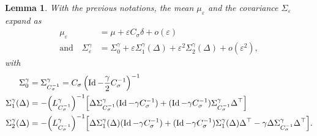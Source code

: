 \documentclass[10pt,a4paper]{amsart}
\newtheorem{lem}{Lemma}
\newcommand{\id}{\operatorname{Id}}
\begin{document}
\begin{lem} \label{lem:Langevin_1}
With the previous notations, the mean $\mu_\varepsilon$ and the covariance $\Sigma_\varepsilon$ expand as 
\begin{align*}
\mu_\varepsilon &=  \mu + \varepsilon C_\sigma \delta   + o(\varepsilon)  \\
\text{and} \quad\Sigma^\gamma_\varepsilon &= \Sigma_0^\gamma  + \varepsilon \Sigma^\gamma_1(\Delta) + \varepsilon^2 \Sigma^\gamma_2(\Delta) + o(\varepsilon^2),
\end{align*}
with 
 \begin{align} \label{eq:Sigma_0}
\Sigma_0^\gamma &= \Sigma^\gamma_{C_\sigma^{-1}} = C_\sigma\left( \id - \frac{\gamma}{2} C_\sigma^{-1} \right)^{-1} \\
\Sigma_1^\gamma(\Delta) &= -\Bigl(L^\gamma_{C_\sigma^{-1}}\Bigr)^{-1}\Bigl[
\Delta \Sigma^\gamma_{C_\sigma^{-1}} (\id - \gamma {C_\sigma^{-1}}) + (\id - \gamma {C_\sigma^{-1}})\Sigma^\gamma_{{C_\sigma^{-1}}} \Delta^\top
\Bigr] \label{eq:Sigma_1}
\\
\Sigma_2^\gamma(\Delta) &= -\Bigl(L^\gamma_{C_\sigma^{-1}}\Bigr)^{-1}\Bigl[
\Delta \Sigma^\gamma_{{1}}(\Delta) (\id - \gamma {C_\sigma^{-1}}) + (\id - \gamma {C_\sigma^{-1}})\Sigma^\gamma_{{1}}(\Delta) \Delta^\top- \gamma   \Delta  \Sigma^\gamma_{{C_\sigma^{-1}}}  \Delta^\top
\Bigr]. \label{eq:Sigma_2}
\end{align}
\end{lem}
\end{document}
